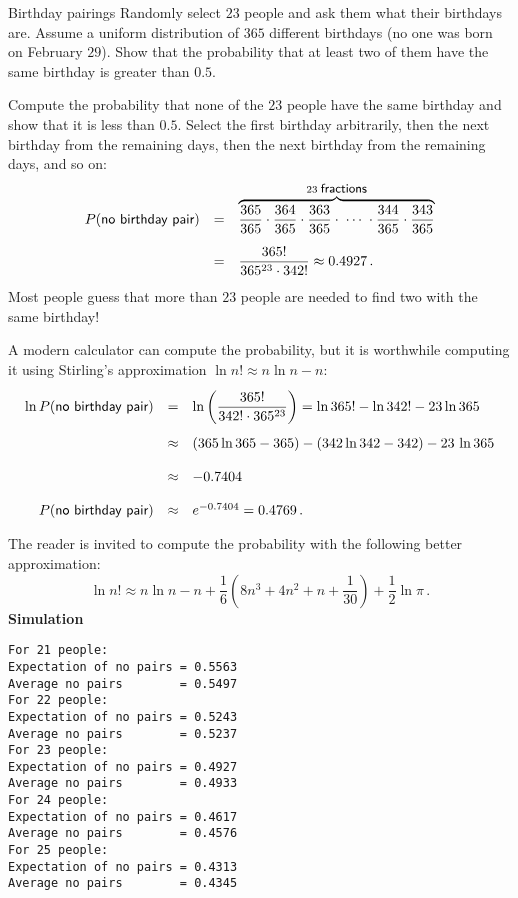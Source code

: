 

\begin{prob}{Birthday pairings}
Randomly select $23$ people and ask them what their birthdays are. Assume a uniform distribution of $365$ different birthdays (no one was born on February $29$). Show that the probability that at least two of them have the same birthday is greater than $0.5$.
\end{prob}

\solution{}

Compute the probability that none of the $23$ people have the same birthday and show that it is less than $0.5$. Select the first birthday arbitrarily, then the next birthday from the remaining days, then the next birthday from the remaining days, and so on:
\[
\renewcommand*{\arraystretch}{2.5}
\begin{array}{rcl}
P(\textsf{no birthday pair})&=&
  \overbrace{\disfrac{365}{365}\cdot\frac{364}{365}
  \cdot\frac{363}{365}\cdot \;\cdots \; \cdot \frac{344}{365}
  \cdot\frac{343}{365}}^{23\;\textsf{\small fractions}}\\
&=&\disfrac{365!}{365^{23}\cdot 342!}\approx 0.4927\,.
\end{array}
\]
Most people guess that more than $23$ people are needed to find two with the same birthday!

A modern calculator can compute the probability, but it is worthwhile computing it using Stirling's approximation $\ln n! \approx n\ln n - n$:
\[
\renewcommand*{\arraystretch}{2}
\begin{array}{rcl}
\ln P(\textsf{no birthday pair})&=&
  \ln\left(\disfrac{365!}{342!\cdot 365^{23}}\right)=\ln 365! - \ln 342! -23 \ln 365\\
&\approx& (365\ln 365 -365) - (342\ln 342 -342) - 23\,\ln 365 \\
&\approx&-0.7404\\
P(\textsf{no birthday pair})&\approx&e^{-0.7404}=0.4769\,.
\end{array}
\]
The reader is invited to compute the probability with the following better approximation:
\[
\ln n!  \approx n\ln n - n + \frac{1}{6}\left(8n^3+4n^2+n+\frac{1}{30}\right)+\frac{1}{2}\ln\pi\,.
\]
\textbf{Simulation}
\begin{verbatim}
For 21 people:
Expectation of no pairs = 0.5563
Average no pairs        = 0.5497
For 22 people:
Expectation of no pairs = 0.5243
Average no pairs        = 0.5237
For 23 people:
Expectation of no pairs = 0.4927
Average no pairs        = 0.4933
For 24 people:
Expectation of no pairs = 0.4617
Average no pairs        = 0.4576
For 25 people:
Expectation of no pairs = 0.4313
Average no pairs        = 0.4345
\end{verbatim}

